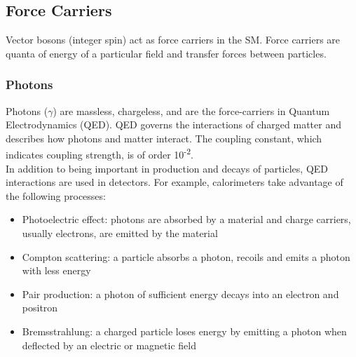 \subsection{Force Carriers}

Vector bosons (integer spin) act as force carriers in the SM.  Force carriers are quanta of energy of a particular field and transfer forces between particles. \\ %



	\subsubsection{Photons}
	
	Photons ($\gamma$) are massless, chargeless, and are the force-carriers in Quantum Electrodynamics (QED).  QED governs the interactions of charged matter and describes how photons and matter interact.  The coupling constant, which indicates coupling strength, is of order 10\textsuperscript{-2}.\\
	
	In addition to being important in production and decays of particles, QED interactions are used in detectors.  For example, calorimeters take advantage of the following processes:
	
	\begin{itemize}
		\item Photoelectric effect: photons are absorbed by a material and charge carriers, usually electrons, are emitted by the material
		\item Compton scattering: a particle absorbs a photon, recoils and emits a photon with less energy
		\item Pair production: a photon of sufficient energy decays into an electron and positron
		\item Bremsstrahlung: a charged particle loses energy by emitting a photon when deflected by an electric or magnetic field
	\end{itemize}
	
